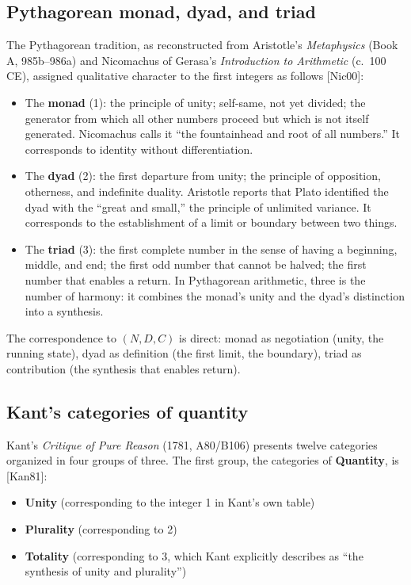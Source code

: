 \documentclass[12pt]{article}
\providecommand{\tightlist}{%
  \setlength{\itemsep}{0pt}\setlength{\parskip}{0pt}}
\begin{document}
\subsection{Pythagorean monad, dyad, and triad}\label{pythagorean-monad-dyad-and-triad}

The Pythagorean tradition, as reconstructed from Aristotle's
\emph{Metaphysics} (Book A, 985b--986a) and Nicomachus of Gerasa's
\emph{Introduction to Arithmetic} (c.~100 CE), assigned qualitative
character to the first integers as follows {[}Nic00{]}:

\begin{itemize}
\tightlist
\item
  The \textbf{monad} (1): the principle of unity; self-same, not yet
  divided; the generator from which all other numbers proceed but which
  is not itself generated. Nicomachus calls it ``the fountainhead and
  root of all numbers.'' It corresponds to identity without
  differentiation.
\item
  The \textbf{dyad} (2): the first departure from unity; the principle
  of opposition, otherness, and indefinite duality. Aristotle reports
  that Plato identified the dyad with the ``great and small,'' the
  principle of unlimited variance. It corresponds to the establishment
  of a limit or boundary between two things.
\item
  The \textbf{triad} (3): the first complete number in the sense of
  having a beginning, middle, and end; the first odd number that cannot
  be halved; the first number that enables a return. In Pythagorean
  arithmetic, three is the number of harmony: it combines the monad's
  unity and the dyad's distinction into a synthesis.
\end{itemize}

The correspondence to \((N, D, C)\) is direct: monad as negotiation
(unity, the running state), dyad as definition (the first limit, the
boundary), triad as contribution (the synthesis that enables return).

\subsection{Kant's categories of quantity}\label{kants-categories-of-quantity}

Kant's \emph{Critique of Pure Reason} (1781, A80/B106) presents twelve
categories organized in four groups of three. The first group, the
categories of \textbf{Quantity}, is {[}Kan81{]}:

\begin{itemize}
\tightlist
\item
  \textbf{Unity} (corresponding to the integer 1 in Kant's own table)
\item
  \textbf{Plurality} (corresponding to 2)
\item
  \textbf{Totality} (corresponding to 3, which Kant explicitly describes
  as ``the synthesis of unity and plurality'')
\end{itemize}
\end{document}
